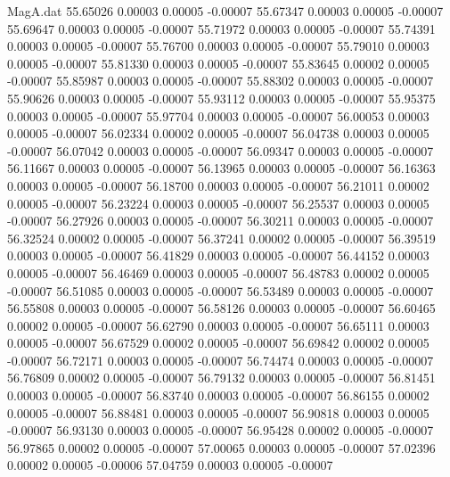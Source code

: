 \begin{filecontents}{MagA.dat}
  55.65026    0.00003    0.00005   -0.00007
  55.67347    0.00003    0.00005   -0.00007
  55.69647    0.00003    0.00005   -0.00007
  55.71972    0.00003    0.00005   -0.00007
  55.74391    0.00003    0.00005   -0.00007
  55.76700    0.00003    0.00005   -0.00007
  55.79010    0.00003    0.00005   -0.00007
  55.81330    0.00003    0.00005   -0.00007
  55.83645    0.00002    0.00005   -0.00007
  55.85987    0.00003    0.00005   -0.00007
  55.88302    0.00003    0.00005   -0.00007
  55.90626    0.00003    0.00005   -0.00007
  55.93112    0.00003    0.00005   -0.00007
  55.95375    0.00003    0.00005   -0.00007
  55.97704    0.00003    0.00005   -0.00007
  56.00053    0.00003    0.00005   -0.00007
  56.02334    0.00002    0.00005   -0.00007
  56.04738    0.00003    0.00005   -0.00007
  56.07042    0.00003    0.00005   -0.00007
  56.09347    0.00003    0.00005   -0.00007
  56.11667    0.00003    0.00005   -0.00007
  56.13965    0.00003    0.00005   -0.00007
  56.16363    0.00003    0.00005   -0.00007
  56.18700    0.00003    0.00005   -0.00007
  56.21011    0.00002    0.00005   -0.00007
  56.23224    0.00003    0.00005   -0.00007
  56.25537    0.00003    0.00005   -0.00007
  56.27926    0.00003    0.00005   -0.00007
  56.30211    0.00003    0.00005   -0.00007
  56.32524    0.00002    0.00005   -0.00007
  56.37241    0.00002    0.00005   -0.00007
  56.39519    0.00003    0.00005   -0.00007
  56.41829    0.00003    0.00005   -0.00007
  56.44152    0.00003    0.00005   -0.00007
  56.46469    0.00003    0.00005   -0.00007
  56.48783    0.00002    0.00005   -0.00007
  56.51085    0.00003    0.00005   -0.00007
  56.53489    0.00003    0.00005   -0.00007
  56.55808    0.00003    0.00005   -0.00007
  56.58126    0.00003    0.00005   -0.00007
  56.60465    0.00002    0.00005   -0.00007
  56.62790    0.00003    0.00005   -0.00007
  56.65111    0.00003    0.00005   -0.00007
  56.67529    0.00002    0.00005   -0.00007
  56.69842    0.00002    0.00005   -0.00007
  56.72171    0.00003    0.00005   -0.00007
  56.74474    0.00003    0.00005   -0.00007
  56.76809    0.00002    0.00005   -0.00007
  56.79132    0.00003    0.00005   -0.00007
  56.81451    0.00003    0.00005   -0.00007
  56.83740    0.00003    0.00005   -0.00007
  56.86155    0.00002    0.00005   -0.00007
  56.88481    0.00003    0.00005   -0.00007
  56.90818    0.00003    0.00005   -0.00007
  56.93130    0.00003    0.00005   -0.00007
  56.95428    0.00002    0.00005   -0.00007
  56.97865    0.00002    0.00005   -0.00007
  57.00065    0.00003    0.00005   -0.00007
  57.02396    0.00002    0.00005   -0.00006
  57.04759    0.00003    0.00005   -0.00007

\end{filecontents}
